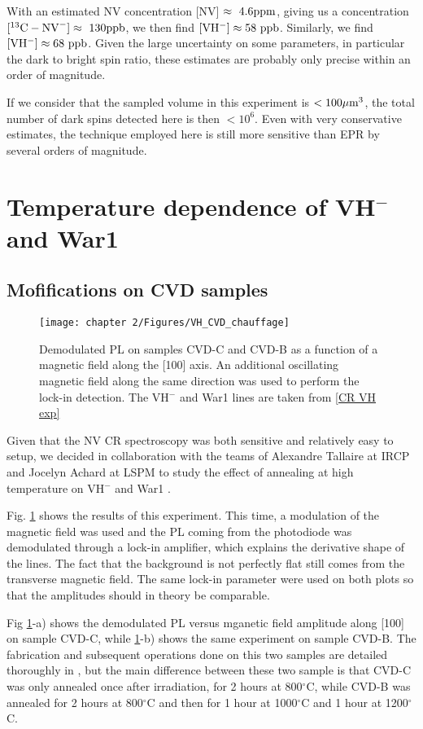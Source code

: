\documentclass[a4paper, 11pt]{book}
\begin{document}
With an estimated NV concentration [NV] $\approx\ \rm 4.6 ppm$, giving us a concentration $[^{13}\rm{C-NV}^-]\approx \ \rm 130 ppb$, we then find $[\rm VH^-] \approx 58\ \rm ppb$. Similarly, we find $[\rm VH^-] \approx 68\ \rm ppb$. Given the large uncertainty on some parameters, in particular the dark to bright spin ratio, these estimates are probably only precise within an order of magnitude.

If we consider that the sampled volume in this experiment is $< 100 \mu \rm{m}^3$, the total number of dark spins detected here is then $< 10^6$. Even with very conservative estimates, the technique employed here is still more sensitive than EPR by several orders of magnitude.

\section{Temperature dependence of VH$^-$ and War1}


\subsection{Mofifications on CVD samples}
\begin{figure}[h]
\centering
\texttt{[image: chapter 2/Figures/VH\_CVD\_chauffage]}
\caption{Demodulated PL on samples CVD-C and CVD-B as a function of a magnetic field along the [100] axis. An additional oscillating magnetic field along the same direction was used to perform the lock-in detection. The VH$^-$ and War1 lines are taken from \ref{CR VH exp}}
\label{chauffage CVD}
\end{figure}

Given that the NV CR spectroscopy was both sensitive and relatively easy to setup, we decided in collaboration with the teams of Alexandre Tallaire at IRCP and Jocelyn Achard at LSPM to study the effect of annealing at high temperature on VH$^-$ and War1 \citep{ngambou2022improving}.

Fig. \ref{chauffage CVD} shows the results of this experiment. This time, a modulation of the magnetic field was used and the PL coming from the photodiode was demodulated through a lock-in amplifier, which explains the derivative shape of the lines. The fact that the background is not perfectly flat still comes from the transverse magnetic field. The same lock-in parameter were used on both plots so that the amplitudes should in theory be comparable.

Fig \ref{chauffage CVD}-a) shows the demodulated PL versus mganetic field amplitude along [100] on sample CVD-C, while \ref{chauffage CVD}-b) shows the same experiment on sample CVD-B. The fabrication and subsequent operations done on this two samples are detailed thoroughly in \citep{ngambou2022improving}, but the main difference between these two sample is that CVD-C was only annealed once after irradiation, for 2 hours at 800$^\circ$C, while CVD-B was annealed for 2 hours at 800$^\circ$C and then for 1 hour at 1000$^\circ$C and 1 hour at 1200$^\circ$C.
\end{document}
